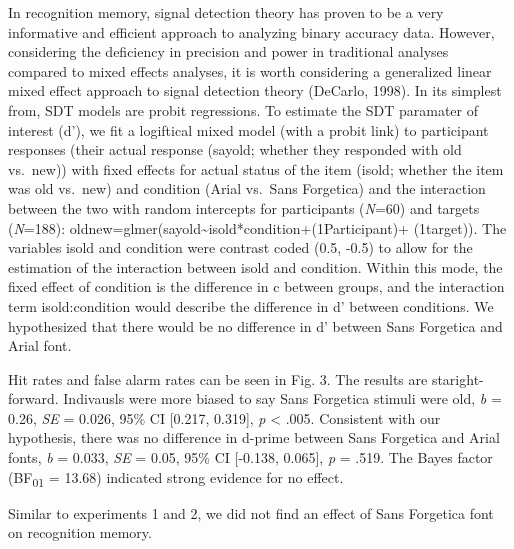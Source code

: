 \documentclass[english,doc]{apa6}
\begin{document}
In recognition memory, signal detection theory has proven to be a very informative and efficient approach to analyzing binary accuracy data. However, considering the deficiency in precision and power in traditional analyses compared to mixed effects analyses, it is worth considering a generalized linear mixed effect approach to signal detection theory (DeCarlo, 1998). In its simplest from, SDT models are probit regressions. To estimate the SDT paramater of interest (d'), we fit a logiftical mixed model (with a probit link) to participant responses (their actual response (sayold; whether they responded with old vs.~new)) with fixed effects for actual status of the item (isold; whether the item was old vs.~new) and condition (Arial vs.~Sans Forgetica) and the interaction between the two with random intercepts for participants (\emph{N}=60) and targets (\emph{N}=188): oldnew=glmer(sayold\textasciitilde{}isold*condition+(1\textbar{}Participant)+ (1\textbar{}target)). The variables isold and condition were contrast coded (0.5, -0.5) to allow for the estimation of the interaction between isold and condition. Within this mode, the fixed effect of condition is the difference in c between groups, and the interaction term isold:condition would describe the difference in d' between conditions. We hypothesized that there would be no difference in d' between Sans Forgetica and Arial font.

Hit rates and false alarm rates can be seen in Fig. 3. The results are staright-forward. Indivausls were more biased to say Sans Forgetica stimuli were old, \emph{b} = 0.26, \emph{SE} = 0.026, 95\% CI {[}0.217, 0.319{]}, \emph{p} \textless{} .005. Consistent with our hypothesis, there was no difference in d-prime between Sans Forgetica and Arial fonts, \emph{b} = 0.033, \emph{SE} = 0.05, 95\% CI {[}-0.138, 0.065{]}, \emph{p} = .519. The Bayes factor (BF\textsubscript{01} = 13.68) indicated strong evidence for no effect.

Similar to experiments 1 and 2, we did not find an effect of Sans Forgetica font on recognition memory.
\end{document}
